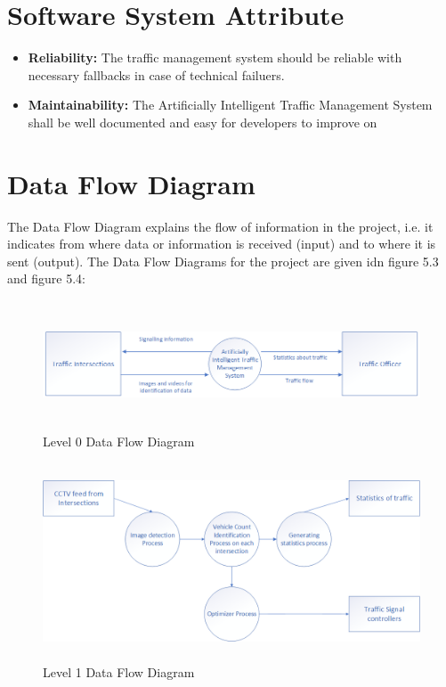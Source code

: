 \documentclass[openany,12pt]{report}
\begin{document}
	\section{Software System Attribute}
	\begin{itemize}
		
		\item{\textbf{Reliability:} The traffic management system should be reliable with necessary fallbacks in case of technical failuers.}
		
		\item{\textbf{Maintainability:}  The Artificially Intelligent Traffic Management System shall be well documented and easy for developers to improve on}
		
	\end{itemize}
	
	\section{Data Flow Diagram}
	
	\hspace*{0.5in}The Data Flow Diagram explains the flow of information in the project, i.e. it indicates from where data or information is received (input) and to where it is sent (output). The Data Flow Diagrams for the project are given idn figure 5.3 and figure 5.4:\\
	
	\begin{figure}[H]
		\centering
		\includegraphics[width=6.8in,height=1.5in]{./Diagrams/PNG/dfd0}
		\caption{Level 0 Data Flow Diagram}
	\end{figure}
	
	\begin{figure}[H]
		\centering
		\includegraphics[width=6.8in,height=2.3in]{./Diagrams/PNG/dfd1}
		\caption{Level 1 Data Flow Diagram}
	\end{figure}
	
\end{document}
